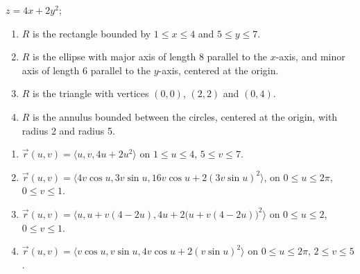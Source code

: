 {$z = 4x+2y^2$;
\begin{enumerate}
	\item $R$ is the rectangle bounded by $1\leq x\leq 4$ and $5\leq y\leq 7$.
	\item	$R$ is the ellipse with major axis of length 8 parallel to the $x$-axis, and minor axis of length 6 parallel to the $y$-axis, centered at the origin.
	\item	$R$ is the triangle with vertices $(0,0)$, $(2,2)$ and $(0,4)$.
	\item	$R$ is the annulus bounded between the circles, centered at the origin, with radius 2 and radius 5.
\end{enumerate}
}
{\begin{enumerate}
	\item $\vec r(u,v) = \langle u, v, 4u+2u^2\rangle$ on $1\leq u\leq 4$, $5\leq v\leq 7$.
	\item	$\vec r(u,v) = \langle 4v\cos u, 3v\sin u, 16v\cos u+2(3v\sin u)^2\rangle$, on $0\leq u\leq 2\pi$, $0\leq v\leq 1$.
	\item	$\vec r(u,v) = \langle u, u+v(4-2u), 4u+2\big(u+v(4-2u)\big)^2\rangle$ on $0\leq u\leq 2$, $0\leq v\leq 1$.
	\item	$\vec r(u,v) = \langle v\cos u, v\sin u, 4v\cos u + 2(v\sin u)^2\rangle$ on $0\leq u\leq 2\pi$, $2\leq v\leq 5$.
\end{enumerate}
}
